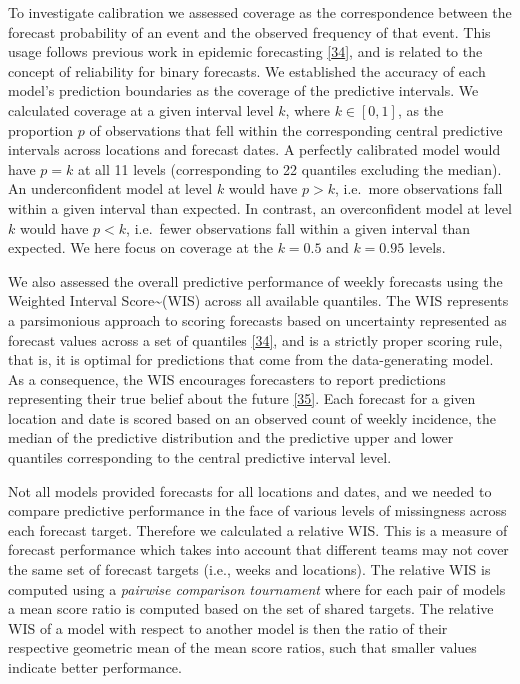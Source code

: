 \documentclass[
]{article}
\begin{document}
To investigate calibration we assessed coverage as the correspondence between the forecast probability of an event and the observed frequency of that event. This usage follows previous work in epidemic forecasting \protect\hyperlink{ref-bracherEvaluatingEpidemicForecasts2021}{{[}34{]}}, and is related to the concept of reliability for binary forecasts. We established the accuracy of each model's prediction boundaries as the coverage of the predictive intervals. We calculated coverage at a given interval level \(k\), where \(k\in[0,1]\), as the proportion \(p\) of observations that fell within the corresponding central predictive intervals across locations and forecast dates. A perfectly calibrated model would have \(p=k\) at all 11 levels (corresponding to 22 quantiles excluding the median). An underconfident model at level \(k\) would have \(p>k\), i.e.~more observations fall within a given interval than expected. In contrast, an overconfident model at level \(k\) would have \(p<k\), i.e.~fewer observations fall within a given interval than expected. We here focus on coverage at the \(k=0.5\) and \(k=0.95\) levels.

We also assessed the overall predictive performance of weekly forecasts using the Weighted Interval Score\textasciitilde(WIS) across all available quantiles. The WIS represents a parsimonious approach to scoring forecasts based on uncertainty represented as forecast values across a set of quantiles \protect\hyperlink{ref-bracherEvaluatingEpidemicForecasts2021}{{[}34{]}}, and is a strictly proper scoring rule, that is, it is optimal for predictions that come from the data-generating model. As a consequence, the WIS encourages forecasters to report predictions representing their true belief about the future \protect\hyperlink{ref-gneitingStrictlyProperScoring2007}{{[}35{]}}. Each forecast for a given location and date is scored based on an observed count of weekly incidence, the median of the predictive distribution and the predictive upper and lower quantiles corresponding to the central predictive interval level.

Not all models provided forecasts for all locations and dates, and we needed to compare predictive performance in the face of various levels of missingness across each forecast target. Therefore we calculated a relative WIS. This is a measure of forecast performance which takes into account that different teams may not cover the same set of forecast targets (i.e., weeks and locations). The relative WIS is computed using a \emph{pairwise comparison tournament} where for each pair of models a mean score ratio is computed based on the set of shared targets. The relative WIS of a model with respect to another model is then the ratio of their respective geometric mean of the mean score ratios, such that smaller values indicate better performance.
\end{document}
